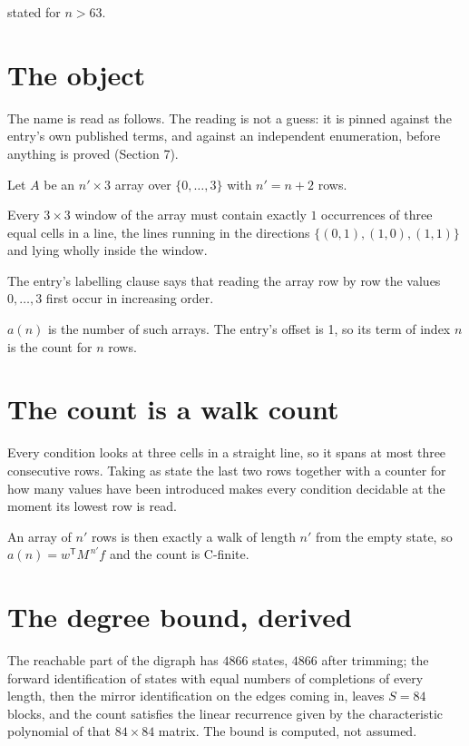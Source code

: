 \documentclass[11pt]{article}
\theoremstyle{definition}
\begin{document}
stated for $n > 63$.

\section{The object}

The name is read as follows. The reading is not a guess: it is pinned against the entry's own published terms, and against an independent enumeration, before anything is proved (Section 7).

Let $A$ be an $n' \times 3$ array over $\{0,\dots,3\}$ with $n' = n + 2$ rows.

Every $3\times3$ window of the array must contain exactly $1$ occurrences of three equal cells in a line, the lines running in the directions $\{(0,1), (1,0), (1,1)\}$ and lying wholly inside the window.

The entry's labelling clause says that reading the array row by row the values $0,\dots,3$ first occur in increasing order.

$a(n)$ is the number of such arrays. The entry's offset is 1, so its term of index $n$ is the count for $n$ rows.

\section{The count is a walk count}

Every condition looks at three cells in a straight line, so it spans at most three consecutive rows. Taking as state the last two rows together with a counter for how many values have been introduced makes every condition decidable at the moment its lowest row is read.

An array of $n'$ rows is then exactly a walk of length $n'$ from the empty state, so $a(n) = w^{\mathsf T}M^{\,n'}f$ and the count is C-finite.

\section{The degree bound, derived}

The reachable part of the digraph has $4866$ states, $4866$ after trimming; the forward identification of states with equal numbers of completions of every length, then the mirror identification on the edges coming in, leaves $S = 84$ blocks, and the count satisfies the linear recurrence given by the characteristic polynomial of that $84\times84$ matrix. The bound is computed, not assumed.
\end{document}
